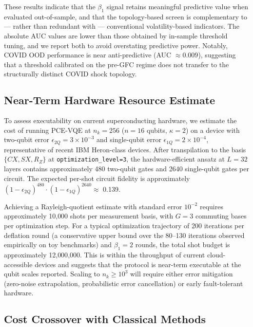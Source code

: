 \documentclass[conference,10pt]{IEEEtran}
\begin{document}
These results indicate that the $\beta_1$ signal retains meaningful
predictive value when evaluated out-of-sample, and that the
topology-based screen is complementary to --- rather than redundant
with --- conventional volatility-based indicators. The absolute AUC
values are lower than those obtained by in-sample threshold tuning,
and we report both to avoid overstating predictive power.
Notably, COVID OOD performance is near anti-predictive
(AUC $\approx 0.009$), suggesting that a threshold calibrated on the
pre-GFC regime does not transfer to the structurally distinct
COVID shock topology.

\subsection{Near-Term Hardware Resource Estimate}
\label{sec:hardware_estimate}

To assess executability on current superconducting hardware, we
estimate the cost of running PCE-VQE at $n_k = 256$
($n = 16$ qubits, $\kappa=2$) on a device with two-qubit error
$\epsilon_{2Q} = 3 \times 10^{-3}$ and single-qubit error
$\epsilon_{1Q} = 2 \times 10^{-4}$, representative of recent IBM
Heron-class devices. After transpilation to the basis
$\{CX, SX, R_Z\}$ at \texttt{optimization\_level=3}, the
hardware-efficient ansatz at $L = 32$ layers contains approximately
480 two-qubit gates and 2640 single-qubit gates per circuit. The
expected per-shot circuit fidelity is approximately
$(1-\epsilon_{2Q})^{480} \cdot (1-\epsilon_{1Q})^{2640} \approx$
0.139.

Achieving a Rayleigh-quotient estimate with standard error $10^{-2}$
requires approximately 10{,}000 shots per measurement basis, with
$G = 3$ commuting bases per optimization step. For a typical
optimization trajectory of 200 iterations per deflation round
(a conservative upper bound over the 80--130 iterations observed
empirically on toy benchmarks) and $\beta_1 = 2$ rounds, the total
shot budget is approximately 12{,}000{,}000.
This is within the throughput of current cloud-accessible devices
and suggests that the protocol is near-term executable at the qubit
scales reported. Scaling to $n_k \geq 10^3$ will require either
error mitigation (zero-noise extrapolation, probabilistic error
cancellation) or early fault-tolerant hardware.

\subsection{Cost Crossover with Classical Methods}
\end{document}
